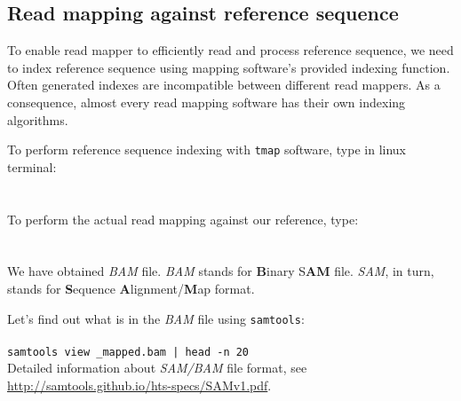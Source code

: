 \subsection{Read mapping against reference sequence}

To enable read mapper to efficiently read and process reference sequence, we need to
index reference sequence using mapping software's provided indexing function. Often generated
indexes are incompatible between different read mappers. As a consequence, almost every read
mapping software has their own indexing algorithms.

To perform reference sequence indexing with \texttt{tmap} software, type in linux terminal:\\~\\
\texttt{}\\

To perform the actual read mapping against our reference, type:\\~\\
\\

We have obtained \textit{BAM} file. \textit{BAM} stands for \textbf{B}inary S\textbf{AM} file.
\textit{SAM}, in turn, stands for \textbf{S}equence \textbf{A}lignment/\textbf{M}ap format.


Let's find out what is in the \textit{BAM} file using \texttt{samtools}:\\~\\
\texttt{samtools view \mapReads\_mapped.bam | head -n 20}\\

Detailed information about \textit{SAM/BAM} file format, see \url{http://samtools.github.io/hts-specs/SAMv1.pdf}.\\~\\
\\

